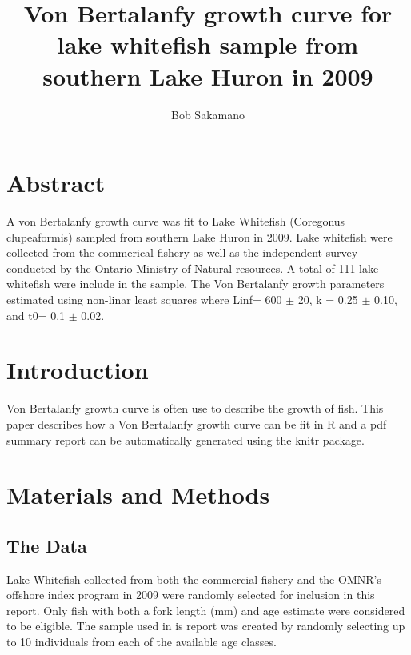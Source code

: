 \documentclass{article}\usepackage[]{graphicx}\usepackage[]{color}
\begin{document}
\graphicspath{{figures/}}


\title{Von Bertalanfy growth curve for lake whitefish sample from
       southern Lake Huron in 2009}


\author{Bob Sakamano}

\maketitle


\section*{Abstract}
\label{sec:abstract}

A von Bertalanfy growth curve was fit to Lake Whitefish (Coregonus
clupeaformis) sampled from southern Lake Huron in 2009.  Lake
whitefish were collected from the commerical fishery as well as the
independent survey conducted by the Ontario Ministry of Natural
resources.  A total of 111 lake whitefish were include in the sample.
The Von Bertalanfy growth parameters estimated using non-linar least
squares where Linf= 600 $\pm$ 20, k = 0.25 $\pm$ 0.10, and t0= 0.1
$\pm$ 0.02.





\section*{Introduction}
\label{sec:introduction}

Von Bertalanfy growth curve is often use to describe the growth of
fish.  This paper describes how a Von Bertalanfy growth curve can be
fit in R and a pdf summary report can be automatically generated using
the knitr package.












\section*{Materials and Methods}
\label{sec:Materials_and_Methods}

\subsection*{The Data}
\label{sub:the_data}

Lake Whitefish collected from both the commercial fishery and the
OMNR's offshore index program in 2009 were randomly selected for
inclusion in this report.  Only fish with both a fork length (mm) and
age estimate were considered to be eligible.  The sample used in is
report was created by randomly selecting up to 10 individuals from each
of the available age classes.
\end{document}
